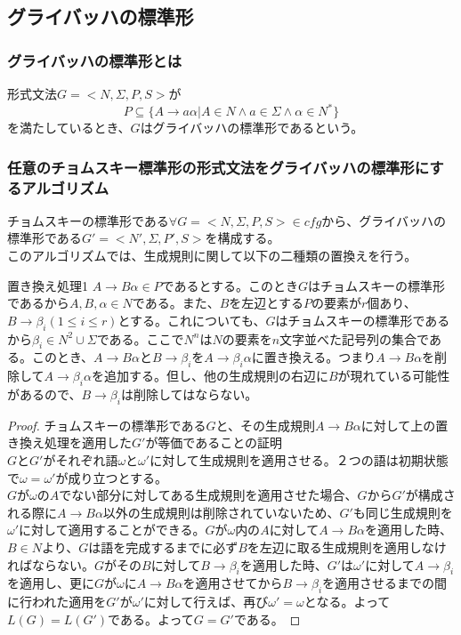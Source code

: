 \documentclass[a4paper]{jarticle}
\begin{document}
\subsection{グライバッハの標準形}
\subsubsection{グライバッハの標準形とは}
形式文法$ G = < N , \Sigma , P , S > $が
\begin{equation}
P \subseteq \bigl\{ A \to a \alpha | A \in N \land a \in \Sigma \land \alpha \in N ^* \bigr\}
\end{equation}
を満たしているとき、$ G $はグライバッハの標準形であるという。\\
\subsubsection{任意のチョムスキー標準形の形式文法をグライバッハの標準形にするアルゴリズム}
チョムスキーの標準形である$ \forall G = < N , \Sigma , P , S > \in cfg $から、グライバッハの標準形である$ G' = < N' , \Sigma , P' , S > $を構成する。\\
このアルゴリズムでは、生成規則に関して以下の二種類の置換えを行う。
\begin{itembox}[l]{置き換え処理1}
$ A \to B \alpha \in P $であるとする。このとき$ G $はチョムスキーの標準形であるから$ A , B , \alpha \in N $である。また、$ B $を左辺とする$ P $の要素が$ r $個あり、$ B \to \beta _i \left( 1 \leq i \leq r \right) $とする。これについても、$ G $はチョムスキーの標準形であるから$ \beta _i \in N ^2 \cup \Sigma $である。ここで$ N^n $は$ N $の要素を$ n $文字並べた記号列の集合である。このとき、$ A \to B \alpha $と$ B \to \beta _i $を$ A \to \beta _i \alpha $に置き換える。つまり$ A \to B \alpha $を削除して$ A \to \beta _i \alpha $を追加する。但し、他の生成規則の右辺に$ B $が現れている可能性があるので、$ B \to \beta _i $は削除してはならない。
\end{itembox}
\begin{proof}
チョムスキーの標準形である$G$と、その生成規則$ A \to B \alpha $に対して上の置き換え処理を適用した$G'$が等価であることの証明\\
$ G $と$ G' $がそれぞれ語$ \omega $と$ \omega ' $に対して生成規則を適用させる。２つの語は初期状態で$ \omega = \omega ' $が成り立つとする。\\
$ G $が$ \omega $の$ A $でない部分に対してある生成規則を適用させた場合、$ G $から$ G' $が構成される際に$ A \to B \alpha $以外の生成規則は削除されていないため、$ G' $も同じ生成規則を$ \omega ' $に対して適用することができる。$ G $が$ \omega $内の$ A $に対して$ A \to B \alpha $を適用した時、$ B \in N $より、$ G $は語を完成するまでに必ず$ B $を左辺に取る生成規則を適用しなければならない。$ G $がその$ B $に対して$ B \to \beta _i $を適用した時、$ G' $は$ \omega ' $に対して$ A \to \beta _i $を適用し、更に$ G $が$ \omega $に$ A \to B \alpha $を適用させてから$ B \to \beta _i $を適用させるまでの間に行われた適用を$ G' $が$ \omega ' $に対して行えば、再び$ \omega ' = \omega $となる。よって$ L \left( G \right) = L \left( G ' \right) $である。よって$ G = G ' $である。
\end{proof}
\end{document}
